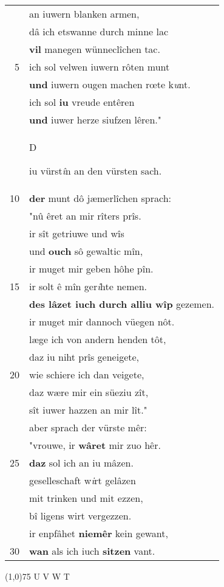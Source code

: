 \documentclass[8pt,a4paper,notitlepage]{article}
\begin{document}
\begin{table}[ht]
\begin{minipage}[t]{0.5\linewidth}
\begin{tabular}{rl}
 & an iuwern blanken armen,\\ 
 & dâ ich etswanne durch minne lac\\ 
 & \textbf{vil} manegen wünneclîchen tac.\\ 
5 & ich sol velwen iuwern rôten munt\\ 
 & \textbf{und} iuwern ougen machen rœte k\textit{u}nt.\\ 
 & ich sol \textbf{iu} vreude entêren\\ 
 & \textbf{und} iuwer herze siufzen lêren."\\ 
 & \begin{large}D\end{large}iu vürst\textit{î}n an den vürsten sach.\\ 
10 & \textbf{der} munt dô jæmerlîchen sprach:\\ 
 & "nû êret an mir rîters prîs.\\ 
 & ir sît getriuwe und wîs\\ 
 & und \textbf{ouch} sô gewaltic mîn,\\ 
 & ir muget mir geben hôhe pîn.\\ 
15 & ir solt ê mîn ger\textit{i}hte nemen.\\ 
 & \textbf{des lâzet iuch durch alliu wîp} gezemen.\\ 
 & ir muget mir dannoch vüegen nôt.\\ 
 & læge ich von andern henden tôt,\\ 
 & daz iu niht prîs geneigete,\\ 
20 & wie schiere ich dan veigete,\\ 
 & daz wære mir ein süeziu zît,\\ 
 & sît iuwer hazzen an mir lît."\\ 
 & aber sprach der vürste mêr:\\ 
 & "vrouwe, ir \textbf{wâret} mir zuo hêr.\\ 
25 & \textbf{daz} sol ich an iu mâzen.\\ 
 & geselleschaft w\textit{i}rt gelâzen\\ 
 & mit trinken und mit ezzen,\\ 
 & bî ligens wirt vergezzen.\\ 
 & ir enpfâhet \textbf{niemêr} kein gewant,\\ 
30 & \textbf{wan} als ich iuch \textbf{sitzen} vant.\\ 
\end{tabular}
\scriptsize
\line(1,0){75} \newline
U V W T \newline

\end{minipage}
\end{table}
\end{document}
